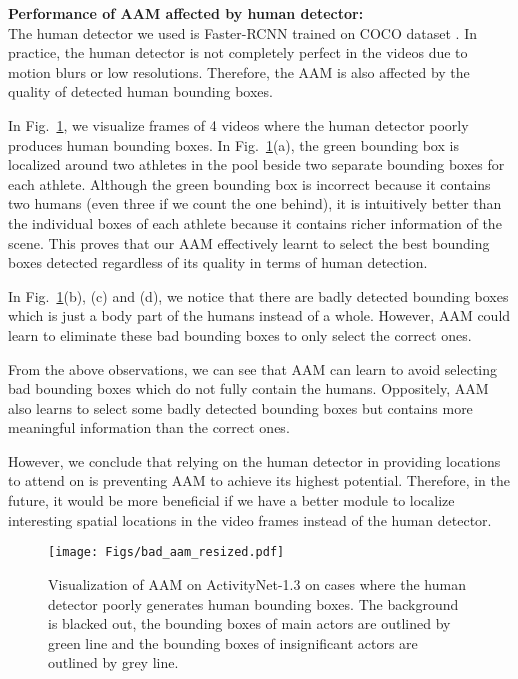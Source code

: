 \documentclass[sn-mathphys]{sn-jnl}
\theoremstyle{thmstyleone}\newtheorem{theorem}{Theorem}\newtheorem{proposition}[theorem]{Proposition}
\theoremstyle{thmstyletwo}\newtheorem{example}{Example}\newtheorem{remark}{Remark}
\theoremstyle{thmstylethree}\newtheorem{definition}{Definition}
\begin{document}
\vspace{2mm}
\noindent\textbf{Performance of AAM affected by human detector:}\\
The human detector we used is Faster-RCNN \cite{FasterRCNN} trained on COCO dataset \cite{cocodataset}. In practice, the human detector is not completely perfect in the videos due to motion blurs or low resolutions. Therefore, the AAM is also affected by the quality of detected human bounding boxes.

In Fig.~\ref{fig:AAM_bad}, we visualize frames of 4 videos where the human detector poorly produces human bounding boxes. In Fig.~\ref{fig:AAM_bad}(a), the green bounding box is localized around two athletes in the pool beside two separate bounding boxes for each athlete. Although the green bounding box is incorrect because it contains two humans (even three if we count the one behind), it is intuitively better than the individual boxes of each athlete because it contains richer information of the scene. This proves that our AAM effectively learnt to select the best bounding boxes detected regardless of its quality in terms of human detection.

In Fig.~\ref{fig:AAM_bad}(b), (c) and (d), we notice that there are badly detected bounding boxes which is just a body part of the humans instead of a whole. However, AAM could learn to eliminate these bad bounding boxes to only select the correct ones.

From the above observations, we can see that AAM can learn to avoid selecting bad bounding boxes which do not fully contain the humans. Oppositely, AAM also learns to select some badly detected bounding boxes but contains more meaningful information than the correct ones.

However, we conclude that relying on the human detector in providing locations to attend on is preventing AAM to achieve its highest potential. Therefore, in the future, it would be more beneficial if we have a better module to localize interesting spatial locations in the video frames instead of the human detector.

\begin{figure}[!t]
    \centering
    \texttt{[image: Figs/bad\_aam\_resized.pdf]}
    \caption{Visualization of AAM on ActivityNet-1.3 \cite{caba2015activitynet} on cases where the human detector poorly generates human bounding boxes. The background is blacked out, the bounding boxes of main actors are outlined by green line and the bounding boxes of insignificant actors are outlined by grey line.}
    \label{fig:AAM_bad}
\end{figure}
\end{document}
